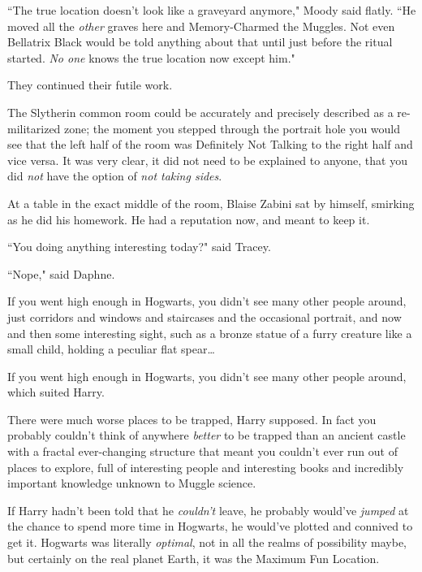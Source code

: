 ``The true location doesn't look like a graveyard anymore," Moody said flatly. ``He moved all the \emph{other} graves here and Memory-Charmed the Muggles. Not even Bellatrix Black would be told anything about that until just before the ritual started. \emph{No one} knows the true location now except him."

They continued their futile work.


The Slytherin common room could be accurately and precisely described as a re-militarized zone; the moment you stepped through the portrait hole you would see that the left half of the room was Definitely Not Talking to the right half and vice versa. It was very clear, it did not need to be explained to anyone, that you did \emph{not} have the option of \emph{not taking sides}.

At a table in the exact middle of the room, Blaise Zabini sat by himself, smirking as he did his homework. He had a reputation now, and meant to keep it.


``You doing anything interesting today?" said Tracey.

``Nope," said Daphne.


If you went high enough in Hogwarts, you didn't see many other people around, just corridors and windows and staircases and the occasional portrait, and now and then some interesting sight, such as a bronze statue of a furry creature like a small child, holding a peculiar flat spear{\ldots}

If you went high enough in Hogwarts, you didn't see many other people around, which suited Harry.

There were much worse places to be trapped, Harry supposed. In fact you probably couldn't think of anywhere \emph{better} to be trapped than an ancient castle with a fractal ever-changing structure that meant you couldn't ever run out of places to explore, full of interesting people and interesting books and incredibly important knowledge unknown to Muggle science.

If Harry hadn't been told that he \emph{couldn't} leave, he probably would've \emph{jumped} at the chance to spend more time in Hogwarts, he would've plotted and connived to get it. Hogwarts was literally \emph{optimal}, not in all the realms of possibility maybe, but certainly on the real planet Earth, it was the Maximum Fun Location.

